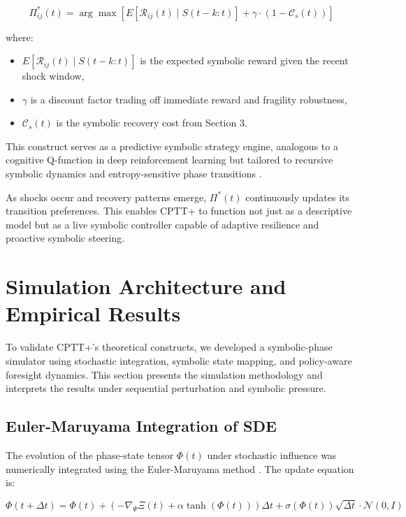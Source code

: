 \documentclass[12pt]{article}
\begin{document}
\begin{equation}
\Pi_{ij}^*(t) = \arg\max \left[ E[ \mathcal{R}_{ij}(t) \mid S(t-k:t) ] + \gamma \cdot (1 - \mathcal{C}_s(t)) \right]
\end{equation}

\noindent where:
\begin{itemize}
  \item $E[ \mathcal{R}_{ij}(t) \mid S(t-k:t) ]$ is the expected symbolic reward given the recent shock window,
  \item $\gamma$ is a discount factor trading off immediate reward and fragility robustness,
  \item $\mathcal{C}_s(t)$ is the symbolic recovery cost from Section 3.
\end{itemize}

This construct serves as a predictive symbolic strategy engine, analogous to a cognitive Q-function in deep reinforcement learning but tailored to recursive symbolic dynamics and entropy-sensitive phase transitions \cite{mnih2015human, russell2016ai}.

As shocks occur and recovery patterns emerge, $\Pi^*(t)$ continuously updates its transition preferences. This enables CPTT+ to function not just as a descriptive model but as a live symbolic controller capable of adaptive resilience and proactive symbolic steering.

\section{Simulation Architecture and Empirical Results}

To validate CPTT+'s theoretical constructs, we developed a symbolic-phase simulator using stochastic integration, symbolic state mapping, and policy-aware foresight dynamics. This section presents the simulation methodology and interprets the results under sequential perturbation and symbolic pressure.

\subsection{Euler-Maruyama Integration of SDE}

The evolution of the phase-state tensor $\Phi(t)$ under stochastic influence was numerically integrated using the Euler-Maruyama method \cite{kloeden1992numerical}. The update equation is:

\begin{equation}
\Phi(t+\Delta t) = \Phi(t) + \left( -\nabla_\Psi \Xi(t) + \alpha \tanh(\Phi(t)) \right) \Delta t + \sigma(\Phi(t)) \sqrt{\Delta t} \cdot \mathcal{N}(0, I)
\end{equation}
\end{document}
